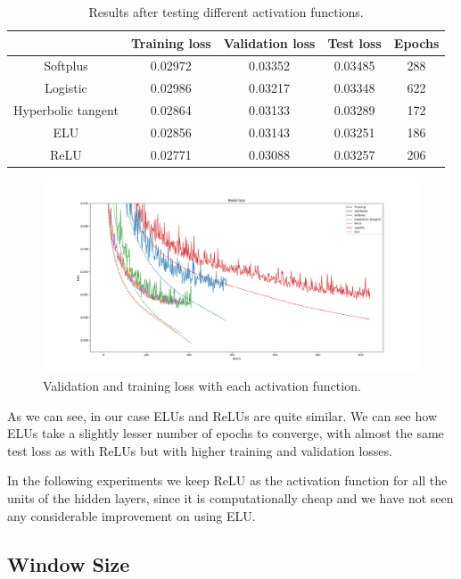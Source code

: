 \documentclass[]{article}
\begin{document}
\begin{table}[H]
	\centering
	\begin{tabular}{@{}ccccc@{}}
		\toprule
		& Training loss & Validation loss & Test loss & Epochs \\ \midrule
		Softplus           & 0.02972       & 0.03352         & 0.03485   & 288    \\
		Logistic           & 0.02986       & 0.03217         & 0.03348   & 622    \\
		Hyperbolic tangent & 0.02864       & 0.03133         & 0.03289   & 172    \\
		ELU                & 0.02856       & 0.03143         & 0.03251   & 186    \\
		ReLU               & 0.02771       & 0.03088         & 0.03257   & 206    \\ \bottomrule
	\end{tabular}
	\caption{Results after testing different activation functions.}
	\label{t:activation}
\end{table}

\begin{figure}[H]
	\centering
	\includegraphics[width=\textwidth]{activation}
	\caption{Validation and training loss with each activation function.}
	\label{f:activation}
\end{figure}

As we can see, in our case ELUs and ReLUs are quite similar. We can see how ELUs take a slightly lesser number of epochs to converge, with almost the same test loss as with ReLUs but with higher training and validation losses.

In the following experiments we keep ReLU as the activation function for all the units of the hidden layers, since it is computationally cheap and we have not seen any considerable improvement on using ELU.

\subsection{Window Size}
\end{document}
